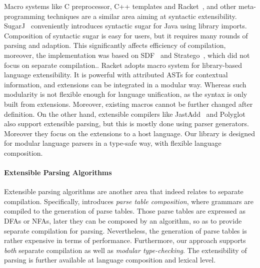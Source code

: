 Macro systems like C preprocessor, C++ templates and
Racket~\cite{Tobin-Hochstadt2011}, and other meta-programming
techniques are a similar area aiming at syntactic extensibility.
SugarJ~\cite{Erdweg2011} conveniently introduces syntactic sugar
for Java using library imports. Composition of syntactic
sugar is easy for users, but it requires many rounds of parsing
and adaption. This significantly affects efficiency of compilation,
moreover, the implementation was based on SDF~\cite{Heering1989} and
Stratego~\cite{Visser2001}, which did not focus on separate
compilation..
Racket adopts macro system for library-based language extensibility. It is powerful with attributed
ASTs for contextual information, and extensions can be integrated in a modular way. Whereas
such modularity is not flexible enough for language unification, as the syntax is only built from extensions.
Moreover, existing macros cannot be further changed after definition. 
On the other hand, extensible compilers like JastAdd~\cite{Ekman2007} and
Polyglot~\cite{Nystrom2003} also support extensible parsing, but this
is mostly done using parser generators. Moreover
they focus on the extensions to a host language. Our library
is designed for modular language parsers in a type-safe way, with
flexible language composition.

\paragraph{Extensible Parsing Algorithms}
Extensible parsing algorithms are another area that indeed relates to
separate compilation. Specifically, \cite{Bravenboer2009} introduces
\textit{parse table composition}, where grammars are compiled
to the generation of parse tables. Those parse tables are expressed as DFAs or NFAs, later they
can be composed by an algorithm, so as to provide separate compilation
for parsing. Nevertheless, the generation of parse tables is rather
expensive in terms of performance.
Furthermore, our approach supports \emph{both} separate compilation
as well as \emph{modular type-checking}. The extensibility of
parsing is further available at language composition
and lexical level.

